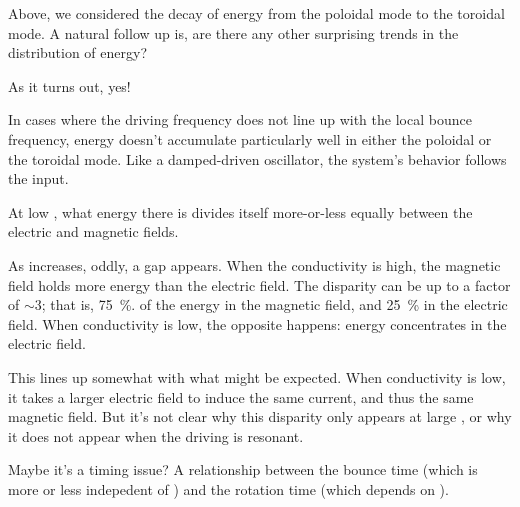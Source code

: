 Above, we considered the decay of energy from the poloidal mode to the toroidal mode. A natural follow up is, are there any other surprising trends in the distribution of energy?

As it turns out, yes!

In cases where the driving frequency does not line up with the local bounce frequency, energy doesn't accumulate particularly well in either the poloidal or the toroidal mode. Like a damped-driven oscillator, the system's behavior follows the input. 

At low \azm, what energy there is divides itself more-or-less equally between the electric and magnetic fields. 

As \azm increases, oddly, a gap appears. When the conductivity is high, the magnetic field holds more energy than the electric field. The disparity can be up to a factor of $\sim \num{3}$; that is, \SI{75}{\percent}. of the energy in the magnetic field, and \SI{25}{\percent} in the electric field. When conductivity is low, the opposite happens: energy concentrates in the electric field. 

This lines up somewhat with what might be expected. When conductivity is low, it takes a larger electric field to induce the same current, and thus the same magnetic field. But it's not clear why this disparity only appears at large \azm, or why it does not appear when the driving is resonant. 

Maybe it's a timing issue? A relationship between the bounce time (which is more or less indepedent of \azm) and the rotation time (which depends on \azm). 


